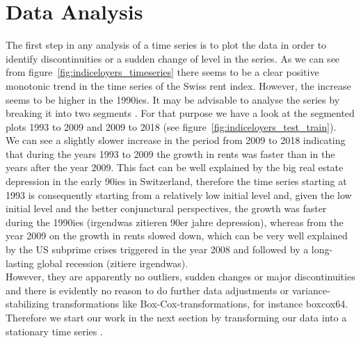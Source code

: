 \documentclass[11pt,a4paper]{article}
\begin{document}

\section{Data Analysis}
The first step in any analysis of a time series is to plot the data in order to identify discontinuities or a sudden change of level in the series\cite[p.~23]{bd02}. As we can see from figure~\ref{fig:indiceloyers_timeseries} there seems to be a clear positive monotonic trend in the time series of the Swiss rent index. However, the increase seems to be higher in the 1990ies. It may be advisable to analyse the series by breaking it into two segments \cite[p.~23]{bd02} . For that purpose we have a look at the segmented plots 1993 to 2009 and 2009 to 2018 (see figure~\ref{fig:indiceloyers_test_train}). \\
We can see a slightly slower increase in the period from 2009 to 2018 indicating that during the years 1993 to 2009 the growth in rents was faster than in the years after the year 2009. This fact can be well explained by the big real estate depression in the early 90ies in Switzerland, therefore the time series starting at 1993 is consequently starting from a relatively low initial level and, given the low initial level and the better conjunctural perspectives, the growth  was faster during the 1990ies (irgendwas zitieren 90er jahre depression), whereas from the year 2009 on the growth in rents slowed down, which can be very well explained by the US subprime crises triggered in the year 2008 and followed by a long-lasting global recession (zitiere irgendwas). \\
However, they are apparently no outliers, sudden changes or major discontinuities and there is evidently no reason to do further data adjustments or variance-stabilizing transformations like Box-Cox-transformations, for instance {boxcox64}. Therefore we start our work in the next section by transforming our data into a stationary time series \cite[p.~45--82]{bd02}.


\end{document}

